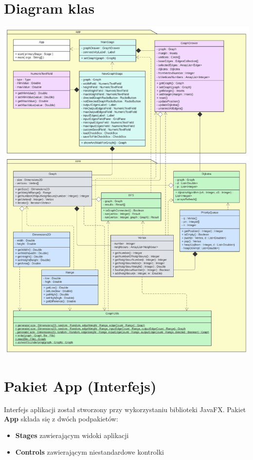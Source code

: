 \documentclass[11pt,a4paper]{report}
\begin{document}
    \section{Diagram klas}
    \begin{center}
        \includegraphics[width=\textwidth]{uml.png}
    \end{center}



    \newpage
    \section{Pakiet App (Interfejs)}

    Interfejs aplikacji został stworzony przy wykorzystaniu biblioteki JavaFX. Pakiet \textbf{App} składa się z dwóch podpakietów:

    \begin{itemize}
        \item \textbf{Stages} zawierającym widoki aplikacji
        \item \textbf{Controls} zawierającym niestandardowe kontrolki
    \end{itemize}
\end{document}
